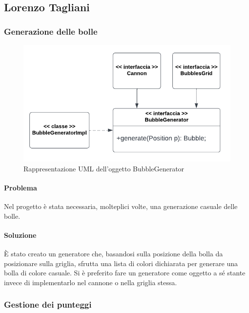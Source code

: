 \documentclass[a4paper,12pt]{report}
\begin{document}
\subsection{Lorenzo Tagliani}
\subsubsection{Generazione delle bolle}

\begin{figure}[H]
	\centering{}
	\includegraphics[width=\textwidth]{img/bubblegenerator.pdf}
	\caption{Rappresentazione UML dell'oggetto BubbleGenerator}
\end{figure}

\paragraph{Problema} Nel progetto è stata necessaria, molteplici volte, una generazione casuale delle bolle.

\paragraph{Soluzione} È stato creato un generatore che, basandosi sulla posizione della bolla da posizionare sulla griglia, sfrutta una lista di colori dichiarata per generare
una bolla di colore casuale. 
Si è preferito fare un generatore come oggetto a sé stante invece di implementarlo nel cannone o nella griglia stessa.

\subsubsection{Gestione dei punteggi}
\end{document}

